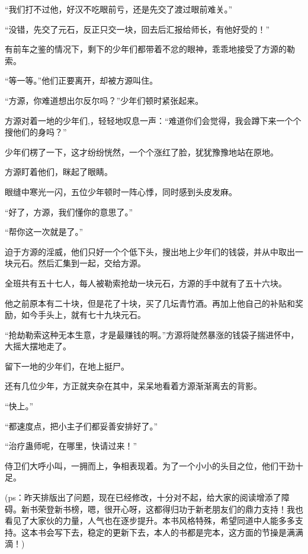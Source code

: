 \begin{this_body}
“我们打不过他，好汉不吃眼前亏，还是先交了渡过眼前难关。”

“没错，先交了元石，反正只交一块，回去后汇报给师长，有他好受的！”

有前车之鉴的情况下，剩下的少年们都带着不忿的眼神，乖乖地接受了方源的勒索。

“等一等。”他们正要离开，却被方源叫住。

“方源，你难道想出尔反尔吗？”少年们顿时紧张起来。

方源对着一地的少年们,，轻轻地叹息一声：“难道你们会觉得，我会蹲下来一个个搜他们的身吗？”

少年们楞了一下，这才纷纷恍然，一个个涨红了脸，犹犹豫豫地站在原地。

方源盯着他们，眯起了眼睛。

眼缝中寒光一闪，五位少年顿时一阵心悸，同时感到头皮发麻。

“好了，方源，我们懂你的意思了。”

“帮你这一次就是了。”

迫于方源的淫威，他们只好一个个低下头，搜出地上少年们的钱袋，并从中取出一块元石。然后汇集到一起，交给方源。

全班共有五十七人，每人被勒索抢劫一块元石，方源的手中就有了五十六块。

他之前原本有二十块，但是花了十块，买了几坛青竹酒。再加上他自己的补贴和奖励，如今手头上，就有七十九块元石。

“抢劫勒索这种无本生意，才是最赚钱的啊。”方源将陡然暴涨的钱袋子揣进怀中，大摇大摆地走了。

留下一地的少年们，在地上挺尸。

还有几位少年，方正就夹杂在其中，呆呆地看着方源渐渐离去的背影。

“快上。”

“都速度点，把小主子们都妥善安排好了。”

“治疗蛊师呢，在哪里，快请过来！”

侍卫们大呼小叫，一拥而上，争相表现着。为了一个小小的头目之位，他们干劲十足。

(ps：昨天排版出了问题，现在已经修改，十分对不起，给大家的阅读增添了障碍。新书荣登新书榜，嗯，很开心呀，这都得归功于新老朋友们的鼎力支持！我也看见了大家伙的力量，人气也在逐步提升。本书风格特殊，希望同道中人能多多支持。这本书会写下去，稳定的更新下去，本人的书都是完本，这方面的节操是满满滴！)

\end{this_body}

